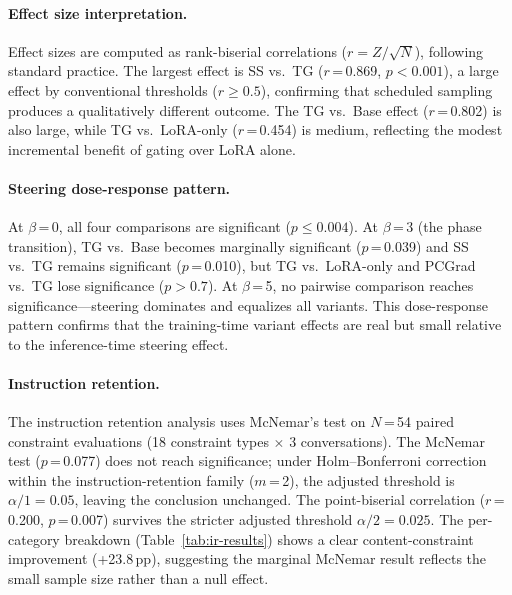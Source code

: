 \paragraph{Effect size interpretation.} Effect sizes are computed as rank-biserial correlations ($r = Z / \sqrt{N}$), following standard practice. The largest effect is SS vs.\ TG ($r$\,=\,0.869, $p < 0.001$), a large effect by conventional thresholds ($r \geq 0.5$), confirming that scheduled sampling produces a qualitatively different outcome. The TG vs.\ Base effect ($r$\,=\,0.802) is also large, while TG vs.\ LoRA-only ($r$\,=\,0.454) is medium, reflecting the modest incremental benefit of gating over LoRA alone.

\paragraph{Steering dose-response pattern.} At $\beta$\,=\,0, all four comparisons are significant ($p \leq 0.004$). At $\beta$\,=\,3 (the phase transition), TG vs.\ Base becomes marginally significant ($p$\,=\,0.039) and SS vs.\ TG remains significant ($p$\,=\,0.010), but TG vs.\ LoRA-only and PCGrad vs.\ TG lose significance ($p > 0.7$). At $\beta$\,=\,5, no pairwise comparison reaches significance---steering dominates and equalizes all variants. This dose-response pattern confirms that the training-time variant effects are real but small relative to the inference-time steering effect.

\paragraph{Instruction retention.} The instruction retention analysis uses McNemar's test on $N$\,=\,54 paired constraint evaluations (18 constraint types $\times$ 3 conversations). The McNemar test ($p$\,=\,0.077) does not reach significance; under Holm--Bonferroni correction within the instruction-retention family ($m$\,=\,2), the adjusted threshold is $\alpha/1 = 0.05$, leaving the conclusion unchanged. The point-biserial correlation ($r$\,=\,0.200, $p$\,=\,0.007) survives the stricter adjusted threshold $\alpha/2 = 0.025$. The per-category breakdown (Table~\ref{tab:ir-results}) shows a clear content-constraint improvement (+23.8\,pp), suggesting the marginal McNemar result reflects the small sample size rather than a null effect.

